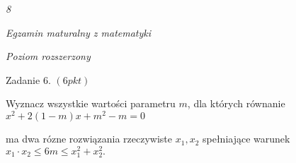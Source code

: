 \documentclass[a4paper,12pt]{article}
\begin{document}
{\it 8}

{\it Egzamin maturalny z matematyki}

{\it Poziom rozszerzony}

Zadanie 6. $(6pkt)$

Wyznacz wszystkie wartości parametru $m$, dla których równanie $x^{2}+2(1-m)x+m^{2}-m=0$

ma dwa rózne rozwiązania rzeczywiste $x_{1}, x_{2}$ spełniające warunek $x_{1}\cdot x_{2}\leq 6m\leq x_{1}^{2}+x_{2}^{2}.$
\end{document}
